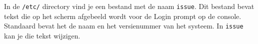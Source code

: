 In de \texttt{/etc/} directory vind je een bestand met de naam \texttt{issue}. Dit bestand bevat tekst die op het scherm afgebeeld wordt voor de Login prompt op de console. Standaard bevat het de naam en het versienummer van het systeem. In \texttt{issue} kan je die tekst wijzigen.

